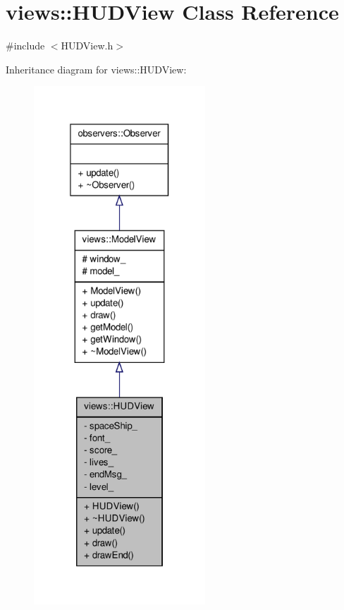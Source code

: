 \hypertarget{classviews_1_1HUDView}{\section{views\-:\-:\-H\-U\-D\-View \-Class \-Reference}
\label{d0/d97/classviews_1_1HUDView}
}


{\ttfamily \#include $<$\-H\-U\-D\-View.\-h$>$}



\-Inheritance diagram for views\-:\-:\-H\-U\-D\-View\-:\nopagebreak
\begin{figure}[H]
\begin{center}
\leavevmode
\includegraphics[height=550pt]{d7/d9b/classviews_1_1HUDView__inherit__graph}
\end{center}
\end{figure}


